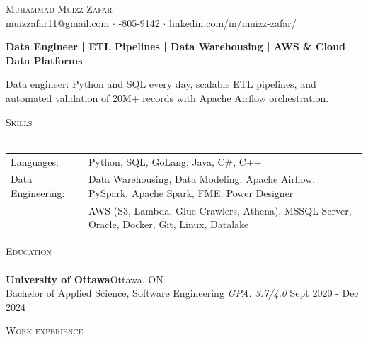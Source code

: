 \documentclass[a4paper]{article}
\newcommand{\lineunder} {
    \vspace*{-8pt} \\
    \hspace*{-18pt} \hrulefill \\
}
\newcommand{\header} [1] {
    {\hspace*{-18pt}\vspace*{6pt} \textsc{#1}}
    \vspace*{-6pt} \lineunder
}
\begin{document}
\vspace*{-40pt}

    

\vspace*{-10pt}
\begin{center}
	{\Huge \scshape {Muhammad Muizz Zafar}}\\
	\faSend \space \href{mailto:muizzafar11@gmail.com}{muizzafar11@gmail.com} $\cdot$ \faPhoneSquare {}-805-9142 $\cdot$ \faLinkedinSquare \space \href{https://www.linkedin.com/in/muizz-zafar/}{linkedin.com/in/muizz-zafar/}
	\\
\end{center}


\vspace{-5pt}
\begin{center}
\textbf{Data Engineer | ETL Pipelines | Data Warehousing | AWS \& Cloud Data Platforms}
\end{center}
\begin{center}
Data engineer: Python and SQL every day, scalable ETL pipelines, and automated validation of 20M+ records with Apache Airflow orchestration.
\end{center}

\header{Skills}
\begin{tabular}{ l l }
	Languages: 
& Python, SQL, GoLang, Java, C\#, C++ \\

Data Engineering: 
& Data Warehousing, Data Modeling, Apache Airflow, PySpark, Apache Spark, FME, Power Designer\\
& AWS (S3, Lambda, Glue Crawlers, Athena), MSSQL Server, Oracle, Docker, Git, Linux, Datalake

\end{tabular}

\header{Education}
\textbf{University of Ottawa}\hfill Ottawa, ON\\
Bachelor of Applied Science, Software Engineering \textit{GPA: 3.7/4.0} \hfill Sept 2020 - Dec 2024\\
\vspace{1mm}

\header{Work experience}
\vspace{1.5mm}
\end{document}
